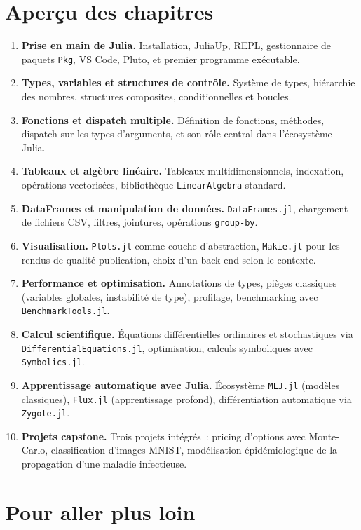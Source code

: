 \documentclass[12pt,a4paper]{article}
\begin{document}
\section*{Aperçu des chapitres}

\begin{enumerate}[leftmargin=2em, itemsep=0.4em]
  \item \textbf{Prise en main de Julia.} Installation, JuliaUp, REPL, gestionnaire de paquets \texttt{Pkg}, VS Code, Pluto, et premier programme exécutable.
  \item \textbf{Types, variables et structures de contrôle.} Système de types, hiérarchie des nombres, structures composites, conditionnelles et boucles.
  \item \textbf{Fonctions et dispatch multiple.} Définition de fonctions, méthodes, dispatch sur les types d'arguments, et son rôle central dans l'écosystème Julia.
  \item \textbf{Tableaux et algèbre linéaire.} Tableaux multidimensionnels, indexation, opérations vectorisées, bibliothèque \texttt{LinearAlgebra} standard.
  \item \textbf{DataFrames et manipulation de données.} \texttt{DataFrames.jl}, chargement de fichiers CSV, filtres, jointures, opérations \texttt{group-by}.
  \item \textbf{Visualisation.} \texttt{Plots.jl} comme couche d'abstraction, \texttt{Makie.jl} pour les rendus de qualité publication, choix d'un back-end selon le contexte.
  \item \textbf{Performance et optimisation.} Annotations de types, pièges classiques (variables globales, instabilité de type), profilage, benchmarking avec \texttt{BenchmarkTools.jl}.
  \item \textbf{Calcul scientifique.} Équations différentielles ordinaires et stochastiques via \texttt{DifferentialEquations.jl}, optimisation, calculs symboliques avec \texttt{Symbolics.jl}.
  \item \textbf{Apprentissage automatique avec Julia.} Écosystème \texttt{MLJ.jl} (modèles classiques), \texttt{Flux.jl} (apprentissage profond), différentiation automatique via \texttt{Zygote.jl}.
  \item \textbf{Projets capstone.} Trois projets intégrés~: pricing d'options avec Monte-Carlo, classification d'images MNIST, modélisation épidémiologique de la propagation d'une maladie infectieuse.
\end{enumerate}

\section*{Pour aller plus loin}
\end{document}

